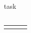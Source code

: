 \cleardoubleoddpage%
{task}%
\cleardoubleoddpage
\vspace*{\fill}
%
%
\subsection*{\TransAuthorshipDeclTitle}

\TransAuthorshipDeclText{}

\makeatletter
\vspace*{1.5cm}%
\begin{center}
	\begin{tabular}{M{12em}M{4em}M{12em}}
		{\textit{\@author}} & & \textit{\TransPlaceDate{}}\\
	\end{tabular}
\end{center}
\makeatother%

\cleardoublepage
